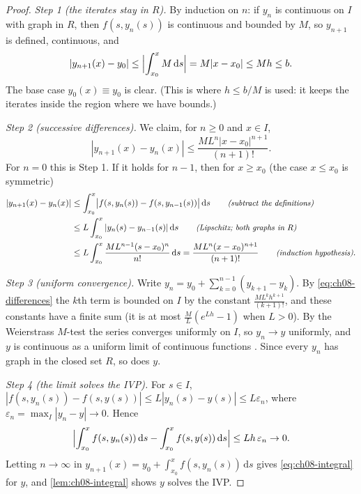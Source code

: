 \begin{proof}
\emph{Step 1 (the iterates stay in $R$).} By induction on $n$: if $y_n$ is
continuous on $I$ with graph in $R$, then $f(s,y_n(s))$ is continuous and
bounded by $M$, so $y_{n+1}$ is defined, continuous, and
\[
  |y_{n+1}(x) - y_0|\le\Bigl|\int_{x_0}^{x}M\,\mathrm{d}s\Bigr| = M|x - x_0|\le Mh\le b .
\]
The base case $y_0(x)\equiv y_0$ is clear. (This is where $h\le b/M$ is used:
it keeps the iterates inside the region where we have bounds.)

\emph{Step 2 (successive differences).} We claim, for $n\ge0$ and $x\in I$,
\begin{equation}\label{eq:ch08-differences}
  |y_{n+1}(x) - y_n(x)|\le\frac{ML^n|x - x_0|^{n+1}}{(n+1)!}.
\end{equation}
For $n = 0$ this is Step 1. If it holds for $n-1$, then for $x\ge x_0$
(the case $x\le x_0$ is symmetric)
\begin{align*}
  |y_{n+1}(x) - y_n(x)|
  &\le\int_{x_0}^{x}\bigl|f(s,y_n(s)) - f(s,y_{n-1}(s))\bigr|\,\mathrm{d}s
     \qquad\text{\small\itshape(subtract the definitions)}\\
  &\le L\int_{x_0}^{x}|y_n(s) - y_{n-1}(s)|\,\mathrm{d}s
     \qquad\text{\small\itshape(Lipschitz; both graphs in $R$)}\\
  &\le L\int_{x_0}^{x}\frac{ML^{n-1}(s - x_0)^{n}}{n!}\,\mathrm{d}s
     = \frac{ML^n(x - x_0)^{n+1}}{(n+1)!}
     \qquad\text{\small\itshape(induction hypothesis)}.
\end{align*}

\emph{Step 3 (uniform convergence).} Write
$y_n = y_0 + \sum_{k=0}^{n-1}(y_{k+1} - y_k)$. By \eqref{eq:ch08-differences}
the $k$th term is bounded on $I$ by the constant $\frac{ML^kh^{k+1}}{(k+1)!}$,
and these constants have a finite sum (it is at most $\frac{M}{L}(e^{Lh} - 1)$
when $L>0$). By the Weierstrass $M$-test the series converges uniformly on
$I$, so $y_n\to y$ uniformly, and $y$ is continuous as a uniform limit of
continuous functions \parencite[Ch.~7]{Rudin}. Since every $y_n$ has graph in
the closed set $R$, so does $y$.

\emph{Step 4 (the limit solves the IVP).} For $s\in I$,
$|f(s,y_n(s)) - f(s,y(s))|\le L|y_n(s) - y(s)|\le L\varepsilon_n$, where
$\varepsilon_n = \max_I|y_n - y|\to0$. Hence
\[
  \Bigl|\int_{x_0}^{x}f(s,y_n(s))\,\mathrm{d}s - \int_{x_0}^{x}f(s,y(s))\,\mathrm{d}s\Bigr|
  \le Lh\,\varepsilon_n\to0 .
\]
Letting $n\to\infty$ in $y_{n+1}(x) = y_0 + \int_{x_0}^xf(s,y_n(s))\,\mathrm{d}s$
gives \eqref{eq:ch08-integral} for $y$, and \cref{lem:ch08-integral} shows $y$
solves the IVP.


\end{proof}
